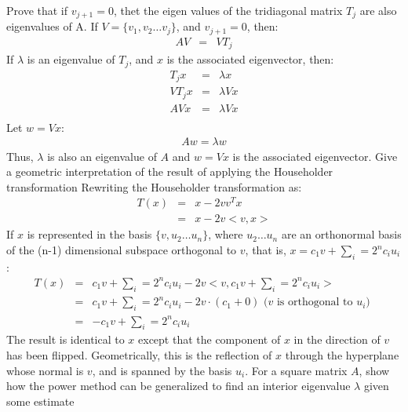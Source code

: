\documentclass{article}
\newcommand{\ea}[1]{\begin{eqnarray*}#1\end{eqnarray*}}
\begin{document}
 Prove that if $v_{j+1}=0$, thet the eigen values of the tridiagonal 
matrix $T_j$ are also eigenvalues of A.
 If $V = \{v_1, v_2 \dots v_j\}$, and $v_{j+1}=0$, then:
\ea{ AV &=& VT_j }
If $\lambda$ is an eigenvalue of $T_j$, and $x$ is the associated eigenvector, 
then:
\ea{ 
T_jx&=& \lambda x\\
VT_jx &=& \lambda V x\\
AVx&=& \lambda V x\\
}
Let $w=Vx$:
\ea{
Aw=\lambda w
}
Thus, $\lambda$ is also an eigenvalue of $A$ and $w=Vx$ is the associated 
eigenvector.
 Give a geometric interpretation of the result of applying the 
Householder transformation
 Rewriting the Householder transformation as:
\ea{
	T(x) &=& x - 2vv^Tx \\
	&=& x - 2v<v,x> 
}
If $x$ is represented in the basis $\{v, u_2 \dots u_{n}\}$, where $u_2\dots u_n$ 
are an orthonormal 
basis of the (n-1) dimensional subspace orthogonal to $v$, that is, 
$x=c_1 v + \sum_i=2^n c_i u_i$:
\ea{
	T(x) &=& c_1 v + \sum_i=2^n c_i u_i - 2v <v, c_1 v + \sum_i=2^n c_i u_i> \\
	&=& c_1 v + \sum_i=2^n c_i u_i - 2v \cdot (c_1 + 0) \textrm{   ($v$ is orthogonal to $u_i$) }\\
	&=& -c_1 v + \sum_i=2^n c_i u_i
}
The result is identical to $x$ except that the component of $x$ in the direction 
of $v$ has been flipped.  Geometrically, this is the reflection of $x$ through 
the hyperplane whose normal is $v$, and is spanned by the basis ${u_i}$.
 For a square matrix $A$, show how the power method can be 
generalized to find an interior eigenvalue $\lambda$ given some estimate 
\end{document}

